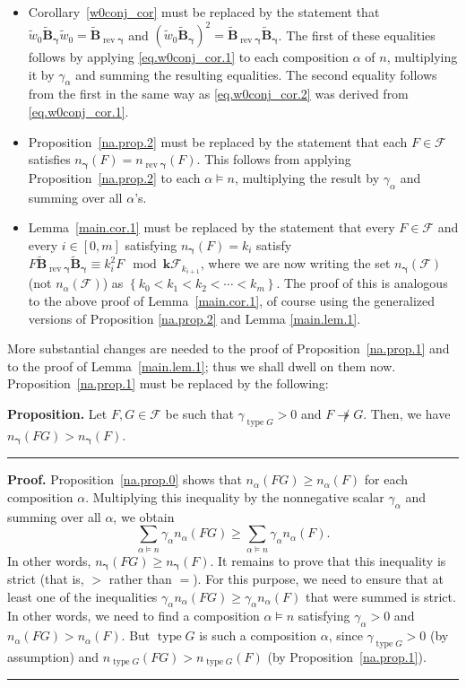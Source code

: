 \documentclass[12pt]{article}
\theoremstyle{definition}%
\newtheorem{prop}[thm]{Proposition}
\theoremstyle{definition}%
\theoremstyle{remark}%
\newcommand{\tup}[1]{\left( #1 \right)}
\newcommand{\interval}[1]{\left[ #1 \right]} %
\newcommand{\set}[1]{\left\{ #1 \right\}}
\newcommand{\kk}{\mathbf{k}}
\newcommand{\kf}{\kk\mathcal{F}}
\newcommand{\BBt}{\widetilde{\mathbf{B}}}
\newcommand{\CF}{\mathcal{F}}
\newcommand{\bgamma}{\bm{\gamma}}
\newcommand{\wotil}{\widetilde{w}_0}
\newcommand{\na}{n_{ \alpha } }%
\newcommand{\rev}{\operatorname{rev}}
\newcommand{\type}{\operatorname{type}}
\newcommand{\con}{\twoheadrightarrow} %
\newenvironment{prop}[1][Proposition]{\noindent\textbf{#1.} }{\ \rule{0.5em}{0.5em}}
\newenvironment{proof}[1][Proof]{\noindent\textbf{#1.} }{\ \rule{0.5em}{0.5em}}
\begin{document}
\begin{itemize}
\item Corollary~\ref{w0conj_cor} must be replaced by the statement that $\wotil \BBt_{\bgamma} \wotil = \BBt_{\rev \bgamma}$ and $\tup{\wotil \BBt_{\bgamma}}^2 = \BBt_{\rev \bgamma} \BBt_{\bgamma}$. The first of these equalities follows by applying \eqref{eq.w0conj_cor.1} to each composition $\alpha$ of $n$, multiplying it by $\gamma_\alpha$ and summing the resulting equalities. The second equality follows from the first in the same way as \eqref{eq.w0conj_cor.2} was derived from \eqref{eq.w0conj_cor.1}.
\item Proposition~\ref{na.prop.2} must be replaced by the statement that each $F \in \CF$ satisfies $n_{\bgamma}\tup{F} = n_{\rev \bgamma}\tup{F}$. This follows from applying Proposition~\ref{na.prop.2} to each $\alpha \models n$, multiplying the result by $\gamma_\alpha$ and summing over all $\alpha$'s.
\item Lemma~\ref{main.cor.1} must be replaced by the statement that every $F \in \CF$ and every $i \in \interval{0, m}$ satisfying $n_{\bgamma} \tup{ F } = k_i $ satisfy $F \BBt_{\rev \bgamma} \BBt_{\bgamma} \equiv k_i^2 F \mod \kf_{k_{i+1}}$, where we are now writing the set $n_{\bgamma}\tup{\CF}$ (not $\na\tup{\CF}$) as $ \set{k_0 < k_1 < k_2 < \cdots < k_m} $. The proof of this is analogous to the above proof of Lemma~\ref{main.cor.1}, of course using the generalized versions of Proposition \ref{na.prop.2} and Lemma \ref{main.lem.1}.
\end{itemize}

More substantial changes are needed to the proof of Proposition~\ref{na.prop.1} and to the proof of Lemma~\ref{main.lem.1}; thus we shall dwell on them now.
Proposition~\ref{na.prop.1} must be replaced by the following:

\begin{prop}
    \label{gen.na.prop.1}
	Let $F,G \in \CF$ be such that $\gamma_{\type G} > 0$ and $F \not\con G$.
	Then, we have $n_{\bgamma}\tup{FG} > n_{\bgamma}\tup{F}$.
\end{prop}

\begin{proof}
Proposition~\ref{na.prop.0} shows that $\na\tup{FG} \geq \na\tup{F}$ for each composition $\alpha$.
Multiplying this inequality by the nonnegative scalar $\gamma_\alpha$ and summing over all $\alpha$, we obtain
\[
\sum_{\alpha \models n} \gamma_\alpha n_\alpha\tup{FG}
\geq \sum_{\alpha \models n} \gamma_\alpha n_\alpha\tup{F}.
\]
In other words, $n_{\bgamma}\tup{FG} \geq n_{\bgamma}\tup{F}$.
It remains to prove that this inequality is strict (that is, $>$ rather than $=$).
For this purpose, we need to ensure that at least one of the inequalities $\gamma_\alpha n_\alpha\tup{FG} \geq \gamma_\alpha n_\alpha\tup{F}$ that were summed is strict.
In other words, we need to find a composition $\alpha \models n$ satisfying $\gamma_\alpha > 0$ and $\na\tup{FG} > \na\tup{F}$.
But $\type G$ is such a composition $\alpha$, since $\gamma_{\type G} > 0$ (by assumption) and $n_{\type G}\tup{FG} > n_{\type G}\tup{F}$ (by Proposition~\ref{na.prop.1}).
\end{proof}
\end{document}
